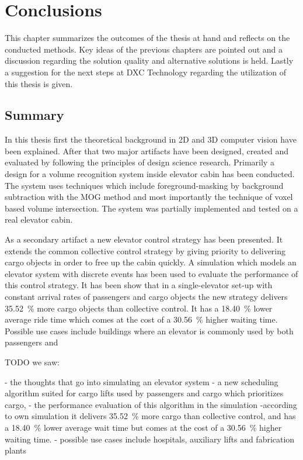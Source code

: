 \chapter{Conclusions}
\label{chap:concl}

This chapter summarizes the outcomes of the thesis at hand 
and reflects on the conducted methods.
Key ideas of the previous chapters are pointed out and a discussion regarding the solution quality and alternative solutions is held.
Lastly a suggestion for the next steps at DXC Technology regarding the utilization of this thesis is given.

\section{Summary}

In this thesis first the theoretical background in \ac{2D} and \ac{3D} computer vision have been explained.
After that two major artifacts have been designed, created and evaluated by following the principles of design science research.
Primarily a design for a volume recognition system inside elevator cabin has been conducted.
The system uses techniques which include foreground-masking by background subtraction with the \ac{MOG} method and most importantly the technique of voxel based volume intersection.
The system was partially implemented and tested on a real elevator cabin.

As a secondary artifact a new elevator control strategy has been presented.
It extends the common collective control strategy by giving priority to delivering cargo objects in order to free up the cabin quickly.
A simulation which models an elevator system with discrete events has been used to evaluate the performance of this control strategy.
It has been show that in a single-elevator set-up with constant arrival rates of passengers and cargo objects the new strategy delivers 35.52~\% more cargo objects than collective control.
It has a 18.40~\% lower average ride time which comes at the cost of a 30.56~\% higher waiting time.
Possible use cases include buildings where an elevator is commonly used by both passengers and 



TODO
we saw:


- the thoughts that go into simulating an elevator system
- a new scheduling algorithm suited for cargo lifts used by passengers and cargo
which prioritizes cargo, 
- the performance evaluation of this algorithm in the simulation
-according to own simulation it delivers 35.52~\% more cargo than collective control, and has a 18.40~\% lower average wait time but comes at the cost of a 30.56~\% higher waiting time.
- possible use cases include hospitals, auxiliary lifts and fabrication plants

